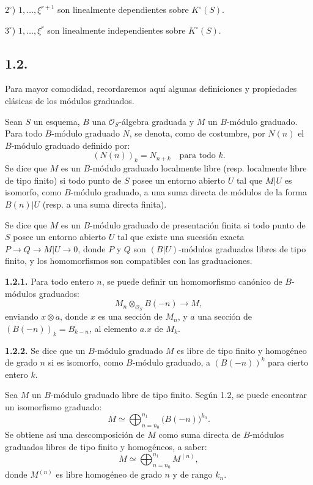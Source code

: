 \(2^\circ\)) \(1,\ldots,\xi^{r+1}\) son linealmente dependientes sobre \(K^\circ(S)\).

\(3^\circ\)) \(1,\ldots,\xi^r\) son linealmente independientes sobre \(K^\circ(S)\).

\subsection*{1.2.}
Para mayor comodidad, recordaremos aquí algunas definiciones y propiedades clásicas de los módulos graduados.

Sean \(S\) un esquema, \(B\) una \(\mathcal O_S\)-álgebra graduada y \(M\) un \(B\)-módulo graduado. Para todo \(B\)-módulo graduado \(N\), se denota, como de costumbre, por \(N(n)\) el \(B\)-módulo graduado definido por:
\[
  (N(n))_k=N_{n+k}\quad\text{para todo }k.
\]
Se dice que \(M\) es un \(B\)-módulo graduado localmente libre (resp. localmente libre de tipo finito) si todo punto de \(S\) posee un entorno abierto \(U\) tal que \(M|U\) es isomorfo, como \(B\)-módulo graduado, a una suma directa de módulos de la forma \(B(n)|U\) (resp. a una suma directa finita).

Se dice que \(M\) es un \(B\)-módulo graduado de presentación finita si todo punto de \(S\) posee un entorno abierto \(U\) tal que existe una sucesión exacta \(P\longrightarrow Q\longrightarrow M|U\longrightarrow 0\), donde \(P\) y \(Q\) son \((B|U)\)-módulos graduados libres de tipo finito, y los homomorfismos son compatibles con las graduaciones.

\textbf{1.2.1.} Para todo entero \(n\), se puede definir un homomorfismo canónico de \(B\)-módulos graduados:
\begin{equation}\tag{1.2.1}
  M_n\otimes_{\mathcal O_S} B(-n)\longrightarrow M,
\end{equation}
enviando \(x\otimes a\), donde \(x\) es una sección de \(M_n\), y \(a\) una sección de \((B(-n))_k=B_{k-n}\), al elemento \(a.x\) de \(M_k\).

\textbf{1.2.2.} Se dice que un \(B\)-módulo graduado \(M\) es libre de tipo finito y homogéneo de grado \(n\) si es isomorfo, como \(B\)-módulo graduado, a \((B(-n))^k\) para cierto entero \(k\).

Sea \(M\) un \(B\)-módulo graduado libre de tipo finito. Según 1.2, se puede encontrar un isomorfismo graduado:
\begin{equation}\tag{1.2.2}
  M\simeq \bigoplus_{n=n_0}^{n_1} \bigl(B(-n)\bigr)^{k_n}.
\end{equation}
Se obtiene así una descomposición de \(M\) como suma directa de \(B\)-módulos graduados libres de tipo finito y homogéneos, a saber:
\[
  M\simeq \bigoplus_{n=n_0}^{n_1}M^{(n)},
\]
donde \(M^{(n)}\) es libre homogéneo de grado \(n\) y de rango \(k_n\).

